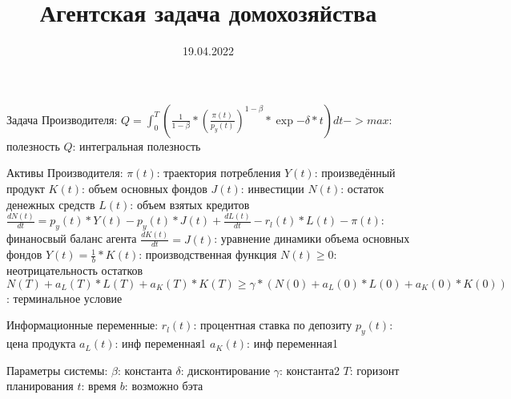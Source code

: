 \documentclass[12pt]{article}
\title{Агентская задача домохозяйства}
\date{19.04.2022}
\begin{document}
Задача Производителя:
    $Q = \int_0^T (\frac{1}{1-\beta} * (\frac{\pi(t)}{p_y(t)})^{1-\beta} * \exp{-\delta*t})dt -> max$: полезность
    $Q$: интегральная полезность

Активы Производителя:
    $\pi(t)$: траектория потребления
    $Y(t)$: произведённый продукт
    $K(t)$: объем основных фондов
    $J(t)$: инвестиции
    $N(t)$: остаток денежных средств
    $L(t)$: объем взятых кредитов
    $\frac{dN(t)}{dt} = p_{y}(t)*Y(t) - p_y(t)*J(t) + \frac{dL(t)}{dt} - r_{l}(t)*L(t) - \pi(t)$: финаносвый баланс агента
    $\frac{dK(t)}{dt} = J(t)$: уравнение динамики объема основных фондов
    $Y(t) = \frac{1}{b} * K(t)$: производственная функция
    $N(t) \geq 0$: неотрицательность остатков
    $N(T) + a_{L}(T) * L(T) + a_{K}(T) * K(T) \geq \gamma * (N(0) + a_{L}(0) * L(0) + a_{K}(0) * K(0))$: терминальное условие

Информационные переменные:
    $r_{l}(t)$: процентная ставка по депозиту
    $p_{y}(t)$: цена продукта
    $a_{L}(t)$: инф переменная1
    $a_{K}(t)$: инф переменная1

Параметры системы:
    $\beta$: константа
    $\delta$: дисконтирование
    $\gamma$: константа2
    $T$: горизонт планирования
    $t$: время
    $b$: возможно бэта
\end{document}
